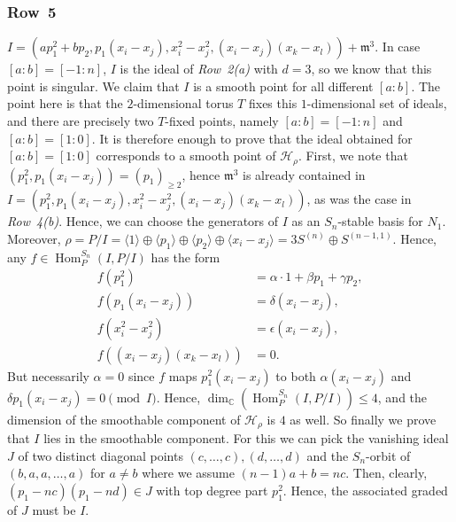 \documentclass[11pt]{amsart}
\theoremstyle{definition}
\newcommand{\CC}{\mathbb{C}}
\newcommand{\mm}{\mathfrak{m}}
\newcommand{\HH}{\mathcal{H}}
\DeclareMathOperator{\Hom}{Hom}
\begin{document}
\subsubsection{Row~5} $I = (ap_1^2+bp_2,p_1(x_i-x_j),x_i^2-x_j^2,(x_i-x_j)(x_k-x_l)) + \mm^3$. In case $[a:b] = [-1:n]$, $I$ is the ideal of \emph{Row~2(a)} with $d = 3$, so we know that this point is singular. We claim that $I$ is a smooth point for all different $[a:b]$. The point here is that the $2$-dimensional torus $T$ fixes this $1$-dimensional set of ideals, and there are precisely two $T$-fixed points, namely $[a:b] = [-1:n]$ and $[a:b] = [1:0]$. It is therefore enough to prove that the ideal obtained for $[a:b] = [1:0]$ corresponds to a smooth point of $\HH_\rho$.
First, we note that $(p_1^2,p_1(x_i - x_j)) = (p_1)_{\geq 2}$, hence $\mm^3$ is already contained in $I = (p_1^2,p_1(x_i-x_j),x_i^2-x_j^2,(x_i-x_j)(x_k-x_l))$, as was the case in \emph{Row~4(b)}.
Hence, we can choose the generators of $I$ as an $S_n$-stable basis for $N_1$. Moreover, $\rho = P/I = \langle 1 \rangle \oplus \langle p_1 \rangle \oplus \langle p_2 \rangle \oplus \langle x_i-x_j \rangle = 3S^{(n)} \oplus S^{(n-1,1)}$. Hence, any $f \in \Hom^{S_n}_{P}(I,P/I)$ has the form
\begin{align*}
    f(p_1^2) &= \alpha \cdot 1 + \beta p_1 + \gamma p_2, \\
    f(p_1(x_i - x_j)) &= \delta (x_i - x_j), \\
    f(x_i^2 - x_j^2) &= \epsilon (x_i - x_j), \\
    f((x_i-x_j)(x_k-x_l)) &= 0.
\end{align*}
But necessarily $\alpha = 0$ since $f$ maps $p_1^2(x_i - x_j)$ to both $\alpha (x_i - x_j)$ and $\delta p_1 (x_i - x_j) = 0 \pmod I$. Hence, $\dim_\CC(\Hom^{S_n}_P(I,P/I)) \leq 4$, and the dimension of the smoothable component of $\HH_\rho$ is $4$ as well.
So finally we prove that $I$ lies in the smoothable component. For this we can pick the vanishing ideal $J$ of two distinct diagonal points $(c,\ldots,c), (d, \ldots, d)$ and the $S_n$-orbit of $(b,a,a,\ldots,a)$ for $a \neq b$ where we assume $(n-1)a+b = nc$. Then, clearly, $(p_1 - nc)(p_1 - nd) \in J$ with top degree part $p_1^2$. Hence, the associated graded of $J$ must be $I$.
\end{document}
